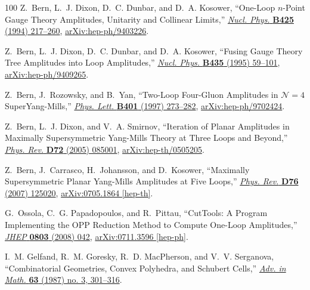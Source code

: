 \documentclass[12pt,hyperref,compress]{JHEP3}
\begin{document}
\begin{thebibliography}{100}
Z.~Bern, L.~J. Dixon, D.~C. Dunbar, and D.~A. Kosower, ``{One-Loop $n$-Point
  Gauge Theory Amplitudes, Unitarity and Collinear Limits},''
  \href{http://dx.doi.org/10.1016/0550-3213(94)90179-1}{{\em Nucl. Phys.} {\bf
  B425} (1994)  217--260},
\href{http://arxiv.org/abs/hep-ph/9403226}{{ arXiv:hep-ph/9403226}}.

Z.~Bern, L.~J. Dixon, D.~C. Dunbar, and D.~A. Kosower, ``{Fusing Gauge Theory
  Tree Amplitudes into Loop Amplitudes},''
  \href{http://dx.doi.org/10.1016/0550-3213(94)00488-Z}{{\em Nucl. Phys.} {\bf
  B435} (1995)  59--101},
\href{http://arxiv.org/abs/hep-ph/9409265}{{ arXiv:hep-ph/9409265}}.

Z.~Bern, J.~Rozowsky, and B.~Yan, ``{Two-Loop Four-Gluon Amplitudes in
  $\mathcal{N}\!=\!4$ SuperYang-Mills},''
  \href{http://dx.doi.org/10.1016/S0370-2693(97)00413-9}{{\em Phys. Lett.} {\bf
  B401} (1997)  273--282},
\href{http://arxiv.org/abs/hep-ph/9702424}{{ arXiv:hep-ph/9702424}}.

Z.~Bern, L.~J. Dixon, and V.~A. Smirnov, ``{Iteration of Planar Amplitudes in
  Maximally Supersymmetric Yang-Mills Theory at Three Loops and Beyond},''
  \href{http://dx.doi.org/10.1103/PhysRevD.72.085001}{{\em Phys. Rev.} {\bf
  D72} (2005)  085001},
\href{http://arxiv.org/abs/hep-th/0505205}{{ arXiv:hep-th/0505205}}.

Z.~Bern, J.~Carrasco, H.~Johansson, and D.~Kosower, ``{Maximally Supersymmetric
  Planar Yang-Mills Amplitudes at Five Loops},''
  \href{http://dx.doi.org/10.1103/PhysRevD.76.125020}{{\em Phys. Rev.} {\bf
  D76} (2007)  125020},
\href{http://arxiv.org/abs/0705.1864}{{ arXiv:0705.1864 [hep-th]}}.

G.~Ossola, C.~G. Papadopoulos, and R.~Pittau, ``{CutTools: A Program
  Implementing the OPP Reduction Method to Compute One-Loop Amplitudes},''
  \href{http://dx.doi.org/10.1088/1126-6708/2008/03/042}{{\em JHEP} {\bf 0803}
  (2008)  042},
\href{http://arxiv.org/abs/0711.3596}{{ arXiv:0711.3596 [hep-ph]}}.

I.~M. Gelfand, R.~M. Goresky, R.~D. MacPherson, and V.~V. Serganova,
  ``{Combinatorial Geometries, Convex Polyhedra, and {S}chubert Cells},''
  \href{http://dx.doi.org/10.1016/0001-8708(87)90059-4}{{\em Adv. in Math.}
  {\bf 63} (1987) no. 3, 301--316}.


\end{thebibliography}
\end{document}
